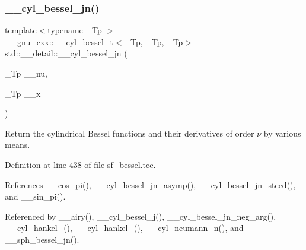 \mbox{\label{namespacestd_1_1____detail_ae70ea3200a43241a3c6a73d3aa2dc1cc}} 
\subsubsection{\texorpdfstring{\+\_\+\+\_\+cyl\+\_\+bessel\+\_\+jn()}{\_\_cyl\_bessel\_jn()}}
{\footnotesize\ttfamily template$<$typename \+\_\+\+Tp $>$ \\
\hyperlink{struct____gnu__cxx_1_1____cyl__bessel__t}{\+\_\+\+\_\+gnu\+\_\+cxx\+::\+\_\+\+\_\+cyl\+\_\+bessel\+\_\+t}$<$\+\_\+\+Tp, \+\_\+\+Tp, \+\_\+\+Tp$>$ std\+::\+\_\+\+\_\+detail\+::\+\_\+\+\_\+cyl\+\_\+bessel\+\_\+jn (\begin{DoxyParamCaption}\item[{\+\_\+\+Tp}]{\+\_\+\+\_\+nu,  }\item[{\+\_\+\+Tp}]{\+\_\+\+\_\+x }\end{DoxyParamCaption})}



Return the cylindrical Bessel functions and their derivatives of order $ \nu $ by various means. 



Definition at line 438 of file sf\+\_\+bessel.\+tcc.



References \+\_\+\+\_\+cos\+\_\+pi(), \+\_\+\+\_\+cyl\+\_\+bessel\+\_\+jn\+\_\+asymp(), \+\_\+\+\_\+cyl\+\_\+bessel\+\_\+jn\+\_\+steed(), and \+\_\+\+\_\+sin\+\_\+pi().



Referenced by \+\_\+\+\_\+airy(), \+\_\+\+\_\+cyl\+\_\+bessel\+\_\+j(), \+\_\+\+\_\+cyl\+\_\+bessel\+\_\+jn\+\_\+neg\+\_\+arg(), \+\_\+\+\_\+cyl\+\_\+hankel\+\_(), \+\_\+\+\_\+cyl\+\_\+hankel\+\_(), \+\_\+\+\_\+cyl\+\_\+neumann\+\_\+n(), and \+\_\+\+\_\+sph\+\_\+bessel\+\_\+jn().

\mbox{\label{namespacestd_1_1____detail_aeab3c6b4c96d8885871d2973b77e537f}} 
